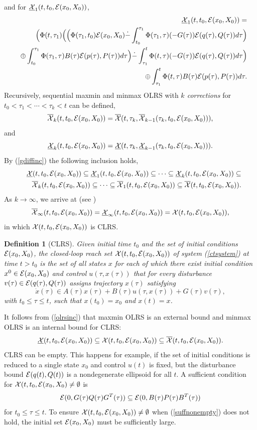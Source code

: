 \documentclass{report}
\newtheorem{df}{Definition}[section]
\newcommand{\bd}{\begin{df}}
\newcommand{\ed}{\end{df}}
\newcommand{\EE}{{\cal E}}
\newcommand{\XX}{{\cal X}}
\begin{document}
and for $\underline{\XX}_1(t,t_0,\EE(x_0,X_0))$,
\begin{eqnarray*}
&& \underline{\XX}_1(t,t_0,\EE(x_0,X_0)) = \\
&& \Big{(}\Phi(t,\tau_1)\Big{(}\Big{(}\Phi(\tau_1,t_0)\EE(x_0,X_0)\dot{-}
\int_{t_0}^{\tau_1}\Phi(\tau_1,\tau)(-G(\tau))\EE(q(\tau),Q(\tau))d\tau\Big{)}\\
&& \oplus\int_{t_0}^{\tau_1}
\Phi(\tau_1,\tau)B(\tau)\EE(p(\tau),P(\tau))d\tau\Big{)}
\dot{-} \int_{\tau_1}^t\Phi(t,\tau)(-G(\tau))\EE(q(\tau),Q(\tau))d\tau\Big{)} \\
&& \oplus\int_{\tau_1}^{t}\Phi(t,\tau)B(\tau)\EE(p(\tau),P(\tau))d\tau .
\end{eqnarray*}
Recursively, sequential maxmin and minmax OLRS with {\it $k$ corrections}
for $t_0<\tau_1<\cdots<\tau_k<t$ can be defined,
\[ \overline{\XX}_k(t,t_0,\EE(x_0,X_0)) =
\overline{\XX}(t,\tau_k,\overline{\XX}_{k-1}(\tau_k,t_0,\EE(x_0,X_0))), \]
and
\[ \underline{\XX}_k(t,t_0,\EE(x_0,X_0)) =
\underline{\XX}(t,\tau_k,\underline{\XX}_{k-1}(\tau_k,t_0,\EE(x_0,X_0))). \]
By (\ref{gdiffinc}) the following inclusion holds,
\begin{eqnarray}
&& \underline{\XX}(t,t_0,\EE(x_0,X_0)) \subseteq
\underline{\XX}_1(t,t_0,\EE(x_0,X_0)) \subseteq
\cdots\subseteq\underline{\XX}_k(t,t_0,\EE(x_0,X_0)) \subseteq \nonumber \\
&& \overline{\XX}_k(t,t_0,\EE(x_0,X_0)) \subseteq \cdots \subseteq
\overline{\XX}_1(t,t_0,\EE(x_0,X_0)) \subseteq
\overline{\XX}(t,t_0,\EE(x_0,X_0)) .
\label{olrsinc}
\end{eqnarray}
As $k\rightarrow\infty$, we arrive at (see \cite{kurvar1})
\[ \overline{\XX}_\infty(t,t_0,\EE(x_0,X_0)) =
\underline{\XX}_\infty(t,t_0,\EE(x_0,X_0))
= \XX(t,t_0,\EE(x_0,X_0)) ,\]
in which $\XX(t,t_0,\EE(x_0,X_0))$ is CLRS.
\bd[CLRS]
Given initial time $t_0$ and the set of initial conditions $\EE(x_0,X_0)$,
the closed-loop reach set $\XX(t,t_0,\EE(x_0,X_0))$ of system (\ref{ctsystem})
at time $t>t_0$ is the set of all states $x$ for each of which
there exist initial condition $x^0\in\EE(x_0,X_0)$ and control $u(\tau,x(\tau))$
that for every disturbance $v(\tau)\in\EE(q(\tau),Q(\tau))$ assigns trajectory
$x(\tau)$ satisfying
\[ \dot{x}(\tau)\in A(\tau)x(\tau) + B(\tau)u(\tau,x(\tau)) + G(\tau)v(\tau),\]
with $t_0\leq\tau\leq t$, such that $x(t_0) = x_0$ and $x(t) = x$.
\ed
It follows from (\ref{olrsinc}) that maxmin OLRS is an external bound
and minmax OLRS is an internal bound for CLRS:
\[ \underline{\XX}(t,t_0,\EE(x_0,X_0)) \subseteq \XX(t,t_0,\EE(x_0,X_0))
\subseteq \overline{\XX}(t,t_0,\EE(x_0,X_0)) .\]
CLRS can be empty.
This happens for example, if the set of initial conditions is reduced
to a single state $x_0$ and control $u(t)$ is fixed,
but the disturbance bound $\EE(q(t),Q(t))$ is a nondegenerate ellipsoid
for all $t$.
A sufficient condition for $\XX(t,t_0,\EE(x_0,X_0)\neq\emptyset$ is
\begin{equation}
\EE(0,G(\tau)Q(\tau)G^T(\tau))\subseteq\EE(0,B(\tau)P(\tau)B^T(\tau))
\label{suffnonempty}
\end{equation}
for $t_0\leq\tau\leq t$.
To ensure $\XX(t,t_0,\EE(x_0,X_0))\neq\emptyset$ when (\ref{suffnonempty})
does not hold, the initial set $\EE(x_0,X_0)$ must be sufficiently large.
\end{document}
